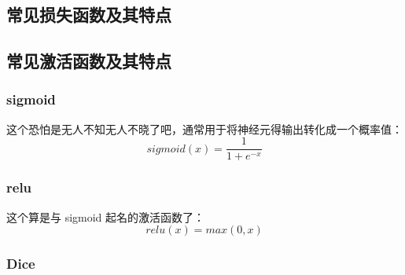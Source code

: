 \subsection{常见损失函数及其特点}


\subsection{常见激活函数及其特点}
\subsubsection{sigmoid}
这个恐怕是无人不知无人不晓了吧，通常用于将神经元得输出转化成一个概率值：
$$
sigmoid(x) = \frac{1}{1 + e^{-x}}
$$

\subsubsection{relu}
这个算是与 sigmoid 起名的激活函数了：
$$
relu(x) = max(0, x)
$$

\subsubsection{Dice}
